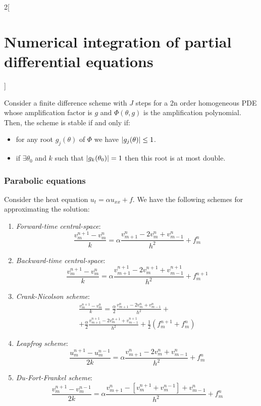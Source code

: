 \documentclass[../../../main_math.tex]{subfiles}
\begin{document}
\begin{multicols}{2}[\section{Numerical integration of partial differential equations}]
\begin{definition}
  \end{definition}
  \begin{theorem}
    Consider a finite difference scheme with $J$ steps for a 2n order homogeneous PDE whose amplification factor is $g$ and $\Phi(\theta, g)$ is the amplification polynomial. Then, the scheme is stable if and only if:
    \begin{itemize}
      \item for any root $g_j(\theta)$ of $\Phi$ we have $\abs{g_j(\theta)}\leq 1$.
      \item if $\exists \theta_0$ and $k$ such that $\abs{g_k(\theta_0)}=1$ then this root is at most double.
    \end{itemize}
  \end{theorem}
  \subsubsection{Parabolic equations}
  \begin{proposition}
    Consider the heat equation $u_t=\alpha u_{xx}+f$. We have the following schemes for approximating the solution:
    \begin{enumerate}
      \item \emph{Forward-time central-space}:
            $$\frac{v_m^{n+1}-v_m^n}{k}=\alpha\frac{v_{m+1}^n-2v_m^n+v_{m-1}^n}{h^2}+f_m^n$$
      \item \emph{Backward-time central-space}:
            $$\frac{v_m^{n+1}-v_m^n}{k}=\alpha\frac{v_{m+1}^{n+1}-2v_m^{n+1}+v_{m-1}^{n+1}}{h^2}+f_m^{n+1}$$
      \item \emph{Crank-Nicolson scheme}:
            \begin{multline*}
              \frac{v_m^{n+1}-v_m^n}{k}=\frac{\alpha}{2}\frac{v_{m+1}^n-2v_m^n+v_{m-1}^n}{h^2}+\\+\frac{\alpha}{2}\frac{v_{m+1}^{n+1}-2v_m^{n+1}+v_{m-1}^{n+1}}{h^2}+\frac{1}{2}(f_m^{n+1}+f_m^n)
            \end{multline*}
      \item \emph{Leapfrog scheme}:
            \begin{equation*}
              \frac{u_m^{n+1}-u_m^{n-1}}{2k}=\alpha\frac{v_{m+1}^n-2v_m^n+v_{m-1}^n}{h^2}+f_m^n
            \end{equation*}
      \item \emph{Du-Fort-Frankel scheme}:
            \begin{equation*}
              \frac{v_m^{n+1}-v_m^{n-1}}{2k}=\alpha\frac{v_{m+1}^{n}-[v_m^{n+1}\!+\!v_m^{n-1}]+v_{m-1}^{n}}{h^2}+f_m^{n}
            \end{equation*}
    \end{enumerate}
  \end{proposition}

\end{multicols}
\end{document}
